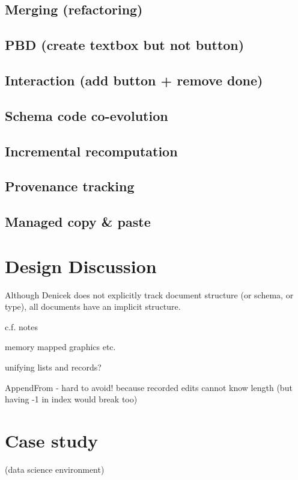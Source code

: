 \documentclass[sigconf]{acmart}
\begin{document}
\subsection{Merging (refactoring)}
\label{sec:impl-collab}

\subsection{PBD (create textbox but not button)}
\label{sec:impl-pbd}

\subsection{Interaction (add button + remove done)}
\label{sec:impl-interaction}

\subsection{Schema code co-evolution}
\label{sec:impl-schema}

\subsection{Incremental recomputation}
\label{sec:impl-eval}

\subsection{Provenance tracking}
\label{sec:impl-provenance}

\subsection{Managed copy \& paste}
\label{sec:impl-copy}

\section{Design Discussion}


Although Denicek does not explicitly track document structure (or schema, or type), all documents
have an implicit structure.

c.f. notes

memory mapped graphics etc.

unifying lists and records?

AppendFrom - hard to avoid! because recorded edits cannot know length
(but having -1 in index would break too)

\section{Case study}
(data science environment)
\end{document}
